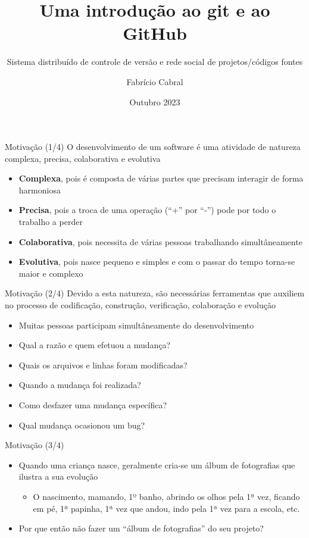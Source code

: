 \documentclass[14pt]{beamer}
\title{Uma introdução ao git e ao GitHub}
\subtitle{Sistema distribuído de controle de versão e rede social de 
projetos/códigos fontes}
\date{Outubro 2023}
\author{Fabrício Cabral}
\institute{IFPE}
\begin{document}
\titlepage

\begin{frame}{Motivação (1/4)}
O desenvolvimento de um software é uma atividade de natureza complexa, precisa,
colaborativa e evolutiva
\begin{itemize}
    \item \textbf{Complexa}, pois é composta de várias partes que precisam
    interagir de forma harmoniosa
    \item \textbf{Precisa}, pois a troca de uma operação (``+'' por ``-'') pode
    por todo o trabalho a perder
    \item \textbf{Colaborativa}, pois necessita de várias pessoas trabalhando
    simultâneamente
    \item \textbf{Evolutiva}, pois nasce pequeno e simples e com o passar do
    tempo torna-se maior e complexo        
\end{itemize}
\end{frame}

\begin{frame}{Motivação (2/4)}
Devido a esta natureza, são necessárias ferramentas que auxiliem no processo de
codificação, construção, verificação, colaboração e evolução
\begin{itemize}
    \item Muitas pessoas participam simultâneamente do desenvolvimento
    \item Qual a razão e quem efetuou a mudança?
    \item Quais os arquivos e linhas foram modificadas?
    \item Quando a mudança foi realizada?
    \item Como desfazer uma mudança específica?
    \item Qual mudança ocasionou um bug?
\end{itemize}
\end{frame}

\begin{frame}{Motivação (3/4)}
\begin{itemize}
    \item Quando uma criança nasce, geralmente cria-se um álbum de fotografias
    que ilustra a sua evolução
    \begin{itemize}
        \item O nascimento, mamando, 1º banho, abrindo os olhos pela 1ª vez,
        ficando em pé, 1ª papinha, 1ª vez que andou, indo pela 1ª vez para a
        escola, etc.
    \end{itemize}
    \item Por que então não fazer um ``álbum de fotografias'' do seu projeto?
  \end{itemize}
\end{frame}
\end{document}
